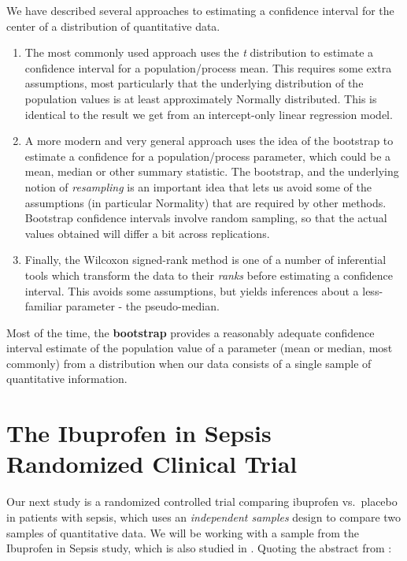 \documentclass[
]{book}
\providecommand{\tightlist}{%
  \setlength{\itemsep}{0pt}\setlength{\parskip}{0pt}}
\begin{document}
We have described several approaches to estimating a confidence interval for the center of a distribution of quantitative data.

\begin{enumerate}
\def\labelenumi{\arabic{enumi}.}
\tightlist
\item
  The most commonly used approach uses the \emph{t} distribution to estimate a confidence interval for a population/process mean. This requires some extra assumptions, most particularly that the underlying distribution of the population values is at least approximately Normally distributed. This is identical to the result we get from an intercept-only linear regression model.
\item
  A more modern and very general approach uses the idea of the bootstrap to estimate a confidence for a population/process parameter, which could be a mean, median or other summary statistic. The bootstrap, and the underlying notion of \emph{resampling} is an important idea that lets us avoid some of the assumptions (in particular Normality) that are required by other methods. Bootstrap confidence intervals involve random sampling, so that the actual values obtained will differ a bit across replications.
\item
  Finally, the Wilcoxon signed-rank method is one of a number of inferential tools which transform the data to their \emph{ranks} before estimating a confidence interval. This avoids some assumptions, but yields inferences about a less-familiar parameter - the pseudo-median.
\end{enumerate}

Most of the time, the \textbf{bootstrap} provides a reasonably adequate confidence interval estimate of the population value of a parameter (mean or median, most commonly) from a distribution when our data consists of a single sample of quantitative information.

\hypertarget{the-ibuprofen-in-sepsis-randomized-clinical-trial}{%
\chapter{The Ibuprofen in Sepsis Randomized Clinical Trial}\label{the-ibuprofen-in-sepsis-randomized-clinical-trial}}

Our next study is a randomized controlled trial comparing ibuprofen vs.~placebo in patients with sepsis, which uses an \emph{independent samples} design to compare two samples of quantitative data. We will be working with a sample from the Ibuprofen in Sepsis study, which is also studied in \citet{Dupont}. Quoting the abstract from \citet{Bernard1997}:
\end{document}
